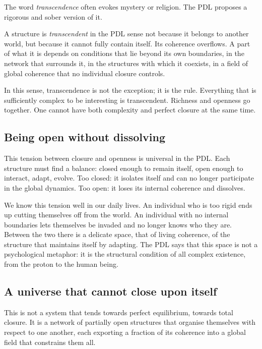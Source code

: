\documentclass[12pt, a4paper, openright]{book}
\begin{document}
The word \emph{transcendence} often evokes mystery or religion. The PDL proposes a rigorous and sober version of it.

\medskip

A structure is \emph{transcendent} in the PDL sense not because it belongs to another world, but because it cannot fully contain itself. Its coherence overflows. A part of what it is depends on conditions that lie beyond its own boundaries, in the network that surrounds it, in the structures with which it coexists, in a field of global coherence that no individual closure controls.

\medskip

In this sense, transcendence is not the exception; it is the rule. Everything that is sufficiently complex to be interesting is transcendent. Richness and openness go together. One cannot have both complexity and perfect closure at the same time.

\subsection*{Being open without dissolving}

This tension between closure and openness is universal in the PDL. Each structure must find a balance: closed enough to remain itself, open enough to interact, adapt, evolve. Too closed: it isolates itself and can no longer participate in the global dynamics. Too open: it loses its internal coherence and dissolves.

\medskip

We know this tension well in our daily lives. An individual who is too rigid ends up cutting themselves off from the world. An individual with no internal boundaries lets themselves be invaded and no longer knows who they are. Between the two there is a delicate space, that of living coherence, of the structure that maintains itself by adapting. The PDL says that this space is not a psychological metaphor: it is the structural condition of all complex existence, from the proton to the human being.

\subsection*{A universe that cannot close upon itself}

This is not a system that tends towards perfect equilibrium, towards total closure. It is a network of partially open structures that organise themselves with respect to one another, each exporting a fraction of its coherence into a global field that constrains them all.
\end{document}
